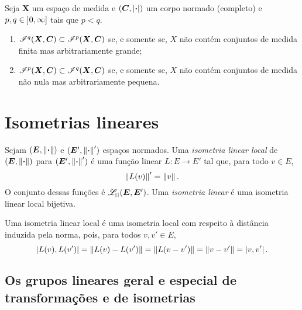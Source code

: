 \begin{proposition}
Seja $\bm X$ um espaço de medida e $(\bm C,\left\vert{\bm{\cdot}}\right\vert)$ um corpo normado (completo) e $p,q \in \left]0,\allowbreak \infty\right]$ tais que $p < q$.
	\begin{enumerate}
	\item $\mathscr{I}^q(\bm X,\bm C) \subset \mathscr{I}^p(\bm X,\bm C)$ se, e somente se, $X$ não contém conjuntos de medida finita mas arbitrariamente grande;

	\item $\mathscr{I}^p(\bm X,\bm C) \subset \mathscr{I}^q(\bm X,\bm C)$ se, e somente se, $X$ não contém conjuntos de medida não nula mas arbitrariamente pequena.
	\end{enumerate}
\end{proposition}




\section{Isometrias lineares}

\begin{definition}
Sejam $(\bm E,\left\Vert{\bm{\cdot}}\right\Vert)$ e $(\bm E',\left\Vert{\bm{\cdot}}\right\Vert')$ espaços normados. Uma \emph{isometria linear local} de $(\bm E,\left\Vert{\bm{\cdot}}\right\Vert)$ para $(\bm E',\left\Vert{\bm{\cdot}}\right\Vert')$ é uma função linear $L\colon E \to E'$ tal que, para todo $v \in E$,
	\begin{equation*}
	\left\Vert{L(v)}\right\Vert' = \left\Vert{v}\right\Vert.
	\end{equation*}
O conjunto dessas funções é $\Linmet(\bm E,\bm E')$. Uma \emph{isometria linear} é uma isometria linear local bijetiva.
\end{definition}

Uma isometria linear local é uma isometria local com respeito à distância induzida pela norma, pois, para todos $v,v' \in E$,
	\begin{equation*}
	\left\vert{L(v)},{L(v')}\right\vert = \left\Vert{L(v) - L(v')}\right\Vert = \left\Vert{L(v - v')}\right\Vert = \left\Vert{v - v'}\right\Vert = \left\vert{v},{v'}\right\vert.
	\end{equation*}





\subsection{Os grupos lineares geral e especial de transformações e de isometrias}

